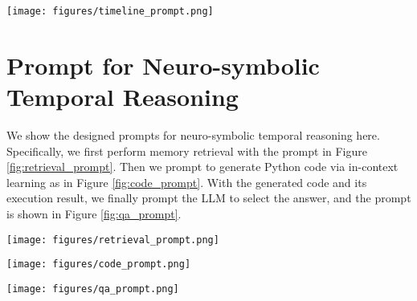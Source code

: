 \begin{figure*}
    \centering
    \texttt{[image: figures/timeline\_prompt.png]}
    \caption{Prompt for Time-aware Memorization.}
    \label{fig:timeline_prompt}
\vspace{-5mm}
\end{figure*}

\section{Prompt for Neuro-symbolic Temporal Reasoning}
\label{sec:reasoning_prompt}
We show the designed prompts for neuro-symbolic temporal reasoning here. Specifically, we first perform memory retrieval with the prompt in Figure \ref{fig:retrieval_prompt}. Then we prompt to generate Python code via in-context learning as in Figure \ref{fig:code_prompt}. With the generated code and its execution result, we finally prompt the LLM to select the answer, and the prompt is shown in Figure \ref{fig:qa_prompt}.

\begin{figure*}
    \centering
    \texttt{[image: figures/retrieval\_prompt.png]}
    \caption{Prompt for memory retrieval.}
    \label{fig:retrieval_prompt}
\vspace{-5mm}
\end{figure*}

\begin{figure*}
    \centering
    \texttt{[image: figures/code\_prompt.png]}
    \caption{Prompt for generating Python code for temporal reasoning.}
    \label{fig:code_prompt}
\vspace{-5mm}
\end{figure*}

\begin{figure*}
    \centering
    \texttt{[image: figures/qa\_prompt.png]}
    \caption{Prompt for temporal question answering.}
    \label{fig:qa_prompt}
\vspace{-5mm}
\end{figure*}